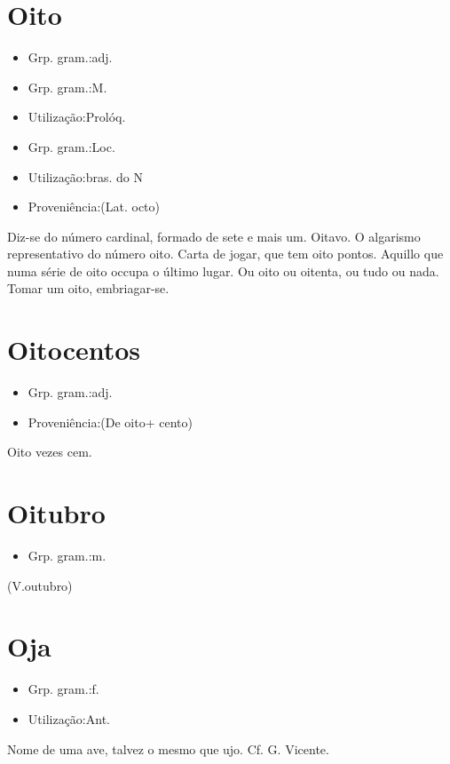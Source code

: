 \section{Oito}
\begin{itemize}
\item {Grp. gram.:adj.}
\end{itemize}
\begin{itemize}
\item {Grp. gram.:M.}
\end{itemize}
\begin{itemize}
\item {Utilização:Prolóq.}
\end{itemize}
\begin{itemize}
\item {Grp. gram.:Loc.}
\end{itemize}
\begin{itemize}
\item {Utilização:bras. do N}
\end{itemize}
\begin{itemize}
\item {Proveniência:(Lat. \textunderscore octo\textunderscore )}
\end{itemize}
Diz-se do número cardinal, formado de sete e mais um.
Oitavo.
O algarismo representativo do número oito.
Carta de jogar, que tem oito pontos.
Aquillo que numa série de oito occupa o último lugar.
\textunderscore Ou oito ou oitenta\textunderscore , ou tudo ou nada.
\textunderscore Tomar um oito\textunderscore , embriagar-se.
\section{Oitocentos}
\begin{itemize}
\item {Grp. gram.:adj.}
\end{itemize}
\begin{itemize}
\item {Proveniência:(De \textunderscore oito\textunderscore  + \textunderscore cento\textunderscore )}
\end{itemize}
Oito vezes cem.
\section{Oitubro}
\begin{itemize}
\item {Grp. gram.:m.}
\end{itemize}
(V.outubro)
\section{Oja}
\begin{itemize}
\item {Grp. gram.:f.}
\end{itemize}
\begin{itemize}
\item {Utilização:Ant.}
\end{itemize}
Nome de uma ave, talvez o mesmo que \textunderscore ujo\textunderscore . Cf. G. Vicente.
